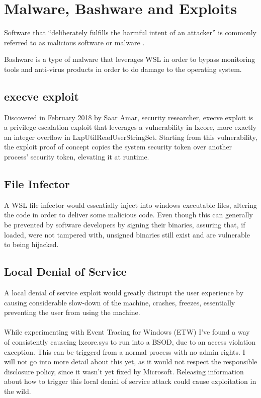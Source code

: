     \section{Malware, Bashware and Exploits}
        Software that “deliberately fulfills the harmful intent of an attacker” is commonly referred to as malicious software or malware
        \cite{ieeeproc2007}.

        Bashware is a type of malware that leverages WSL in order to bypass monitoring tools and anti-virus products in order to do damage to the
        operating system.
        
        \subsection{execve exploit}
            Discovered in February 2018 by Saar Amar, security researcher, execve exploit\cite{execve} is a privilege escalation exploit that
            leverages a vulnerability in lxcore, more exactly an integer overflow in LxpUtilReadUserStringSet. Starting from this vulnerability,
            the exploit proof of concept copies the system security token over another process' security token, elevating it at runtime.

        \subsection{File Infector}
            A WSL file infector would essentially inject into windows executable files, altering the code in order to deliver some malicious
            code. Even though this can generally be prevented by software developers by signing their binaries, assuring that, if loaded, were
            not tampered with, unsigned binaries still exist and are vulnerable to being hijacked.
            
        \subsection{Local Denial of Service}
            A local denial of service exploit would greatly distrupt the user experience by causing considerable slow-down of 
            the machine, crashes, freezes, essentially preventing the user from using the machine.

            \paragraph{}
            While experimenting with Event Tracing for Windows (ETW) I've found a way of consistently causeing lxcore.sys to run into a BSOD, 
            due to an access violation exception. This can be triggerd from a normal process with no admin rights. I will not go into more 
            detail about this yet, as it would not respect the responsible disclosure policy, since it wasn't yet fixed by Microsoft. Releasing
            information about how to trigger this local denial of service attack could cause exploitation in the wild.

